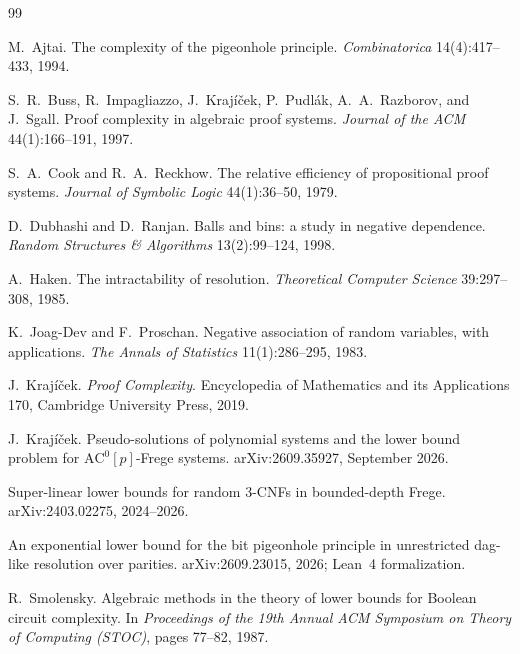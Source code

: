 \documentclass[11pt]{article}
\theoremstyle{definition}
\theoremstyle{remark}
\newcommand{\AC}{\mathrm{AC}}
\begin{document}
\begin{thebibliography}{99}

M.~Ajtai.
\newblock The complexity of the pigeonhole principle.
\newblock \emph{Combinatorica} 14(4):417--433, 1994.

S.~R.~Buss, R.~Impagliazzo, J.~Kraj\'i\v{c}ek, P.~Pudl\'ak,
A.~A.~Razborov, and J.~Sgall.
\newblock Proof complexity in algebraic proof systems.
\newblock \emph{Journal of the ACM} 44(1):166--191, 1997.

S.~A.~Cook and R.~A.~Reckhow.
\newblock The relative efficiency of propositional proof systems.
\newblock \emph{Journal of Symbolic Logic} 44(1):36--50, 1979.

D.~Dubhashi and D.~Ranjan.
\newblock Balls and bins: a study in negative dependence.
\newblock \emph{Random Structures \& Algorithms} 13(2):99--124, 1998.

A.~Haken.
\newblock The intractability of resolution.
\newblock \emph{Theoretical Computer Science} 39:297--308, 1985.

K.~Joag-Dev and F.~Proschan.
\newblock Negative association of random variables, with applications.
\newblock \emph{The Annals of Statistics} 11(1):286--295, 1983.

J.~Kraj\'i\v{c}ek.
\newblock \emph{Proof Complexity}.
\newblock Encyclopedia of Mathematics and its Applications 170, Cambridge
University Press, 2019.

J.~Kraj\'i\v{c}ek.
\newblock Pseudo-solutions of polynomial systems and the lower bound
problem for $\AC^0[p]$-Frege systems.
\newblock arXiv:2609.35927, September 2026.

Super-linear lower bounds for random $3$-CNFs in bounded-depth Frege.
\newblock arXiv:2403.02275, 2024--2026.

An exponential lower bound for the bit pigeonhole principle in
unrestricted dag-like resolution over parities.
\newblock arXiv:2609.23015, 2026; Lean~4 formalization.

R.~Smolensky.
\newblock Algebraic methods in the theory of lower bounds for Boolean
circuit complexity.
\newblock In \emph{Proceedings of the 19th Annual ACM Symposium on
Theory of Computing (STOC)}, pages 77--82, 1987.

\end{thebibliography}
\end{document}
